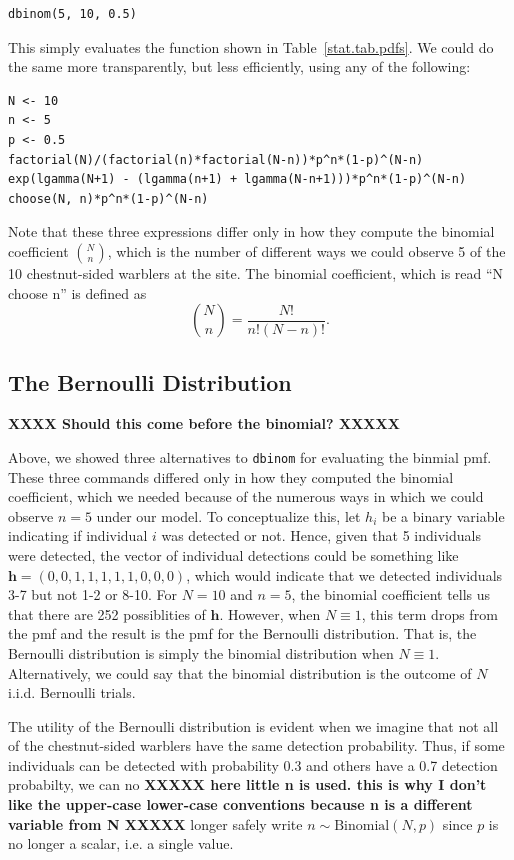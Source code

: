 \begin{verbatim}
dbinom(5, 10, 0.5)
\end{verbatim}
This simply evaluates the function shown in
Table~\ref{stat.tab.pdfs}. We could do the same more transparently, but
less efficiently, using any of the following:
\begin{verbatim}
N <- 10
n <- 5
p <- 0.5
factorial(N)/(factorial(n)*factorial(N-n))*p^n*(1-p)^(N-n)
exp(lgamma(N+1) - (lgamma(n+1) + lgamma(N-n+1)))*p^n*(1-p)^(N-n)
choose(N, n)*p^n*(1-p)^(N-n)
\end{verbatim}

Note that these three expressions differ only in how they compute the
binomial coefficient $\binom{N}{n}$, which is the number of different ways
we could observe 5 of the 10 chestnut-sided warblers at the site. The
binomial coefficient, which is read ``N choose n'' is defined as
\begin{equation}
  \label{eq:1}
  \binom{N}{n} = \frac{N!}{n!(N-n)!}.
\end{equation}





\subsection{The Bernoulli Distribution}

{\bf XXXX Should this come before the binomial? XXXXX}


Above, we showed three alternatives to \verb+dbinom+ for evaluating the
binmial pmf. These three commands differed only in how they computed
the binomial coefficient, which we needed because of the numerous ways
in which we could observe $n=5$ under our model. To conceptualize
this, let $h_i$ be a binary variable indicating if individual $i$
was detected or not. Hence, given that 5 individuals were detected,
the vector of individual detections could be something like
$\mathbf{h}=(0,0,1,1,1,1,1,0,0,0)$, which would indicate
that we detected individuals 3-7 but not 1-2 or 8-10. For $N=10$ and
$n=5$, the binomial coefficient tells us that there
are 252 possiblities of $\mathbf{h}$. However, when $N \equiv 1$, this term
drops from the pmf and the result is the pmf for the Bernoulli
distribution. That is, the Bernoulli distribution is simply the
binomial distribution when $N \equiv 1$. Alternatively, we could say that the binomial
distribution is the outcome of $N$ i.i.d. Bernoulli trials.

The utility of the Bernoulli distribution is evident when we imagine
that not all of the chestnut-sided warblers have the same detection
probability. Thus, if some individuals can be detected with
probability 0.3 and others have a 0.7 detection probabilty, we can no
{\bf XXXXX here little n is used. this is why I don't like the
  upper-case lower-case conventions because n is a different variable
  from N XXXXX}
longer safely write $n \sim \text{Binomial}(N, p)$ since $p$ is no
longer a scalar, i.e. a single value.


